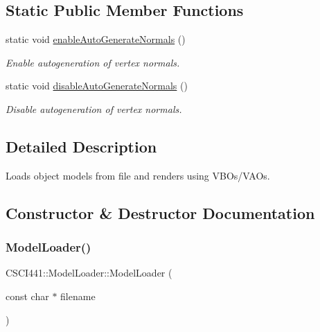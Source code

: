 \subsection*{Static Public Member Functions}
\begin{DoxyCompactItemize}
\item 
static void \hyperlink{class_c_s_c_i441_1_1_model_loader_a202848314c149e59b5211858ff082072}{enable\+Auto\+Generate\+Normals} ()
\begin{DoxyCompactList}\small\item\em Enable autogeneration of vertex normals. \end{DoxyCompactList}\item 
static void \hyperlink{class_c_s_c_i441_1_1_model_loader_aaf1ec38a0f551569ccf1a47af2a561f3}{disable\+Auto\+Generate\+Normals} ()
\begin{DoxyCompactList}\small\item\em Disable autogeneration of vertex normals. \end{DoxyCompactList}\end{DoxyCompactItemize}


\subsection{Detailed Description}
Loads object models from file and renders using V\+B\+Os/\+V\+A\+Os. 

\subsection{Constructor \& Destructor Documentation}
\mbox{\label{class_c_s_c_i441_1_1_model_loader_a1223befa1c79f54b33a48a13efd8f639}} 
\subsubsection{\texorpdfstring{Model\+Loader()}{ModelLoader()}}
{\footnotesize\ttfamily C\+S\+C\+I441\+::\+Model\+Loader\+::\+Model\+Loader (\begin{DoxyParamCaption}\item[{const char $\ast$}]{filename }\end{DoxyParamCaption})\hspace{0.3cm}{\ttfamily [inline]}}



